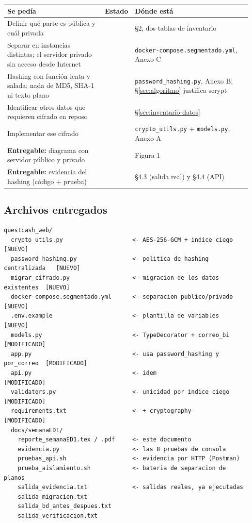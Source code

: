 \documentclass[11pt,letterpaper]{article}
\newcommand{\ok}{\textcolor{qcGreen}{\textbf{\checkmark}}}
\begin{document}
\begin{center}
\small
\begin{tabular}{@{}>{\raggedright\arraybackslash}p{6.3cm} c >{\raggedright\arraybackslash}p{6.0cm}@{}}
\toprule
\textbf{Se pedía} & \textbf{Estado} & \textbf{Dónde está} \\
\midrule
Definir qué parte es pública y cuál privada & \ok & \S2, dos tablas de inventario \\[3pt]
Separar en instancias distintas; el servidor privado sin acceso desde Internet & \ok & \texttt{docker-compose.segmentado.yml}, Anexo C \\[3pt]
Hashing con función lenta y salada; nada de MD5, SHA-1 ni texto plano & \ok & \texttt{password\_hashing.py}, Anexo B; \S\ref{sec:algoritmo} justifica scrypt \\[3pt]
Identificar otros datos que requieren cifrado en reposo & \ok & \S\ref{sec:inventario-datos} \\[3pt]
Implementar ese cifrado & \ok & \texttt{crypto\_utils.py} + \texttt{models.py}, Anexo A \\[3pt]
\textbf{Entregable:} diagrama con servidor público y privado & \ok & Figura 1 \\[3pt]
\textbf{Entregable:} evidencia del hashing (código + prueba) & \ok & \S4.3 (salida real) y \S4.4 (API) \\
\bottomrule
\end{tabular}
\end{center}

\subsection{Archivos entregados}

\begin{lstlisting}[style=terminal]
questcash_web/
  crypto_utils.py                    <- AES-256-GCM + indice ciego         [NUEVO]
  password_hashing.py                <- politica de hashing centralizada   [NUEVO]
  migrar_cifrado.py                  <- migracion de los datos existentes  [NUEVO]
  docker-compose.segmentado.yml      <- separacion publico/privado         [NUEVO]
  .env.example                       <- plantilla de variables             [NUEVO]
  models.py                          <- TypeDecorator + correo_bi          [MODIFICADO]
  app.py                             <- usa password_hashing y por_correo  [MODIFICADO]
  api.py                             <- idem                               [MODIFICADO]
  validators.py                      <- unicidad por indice ciego          [MODIFICADO]
  requirements.txt                   <- + cryptography                     [MODIFICADO]
  docs/semanaED1/
    reporte_semanaED1.tex / .pdf     <- este documento
    evidencia.py                     <- las 8 pruebas de consola
    pruebas_api.sh                   <- evidencia por HTTP (Postman)
    prueba_aislamiento.sh            <- bateria de separacion de planos
    salida_evidencia.txt             <- salidas reales, ya ejecutadas
    salida_migracion.txt
    salida_bd_antes_despues.txt
    salida_verificacion.txt
\end{lstlisting}
\end{document}
